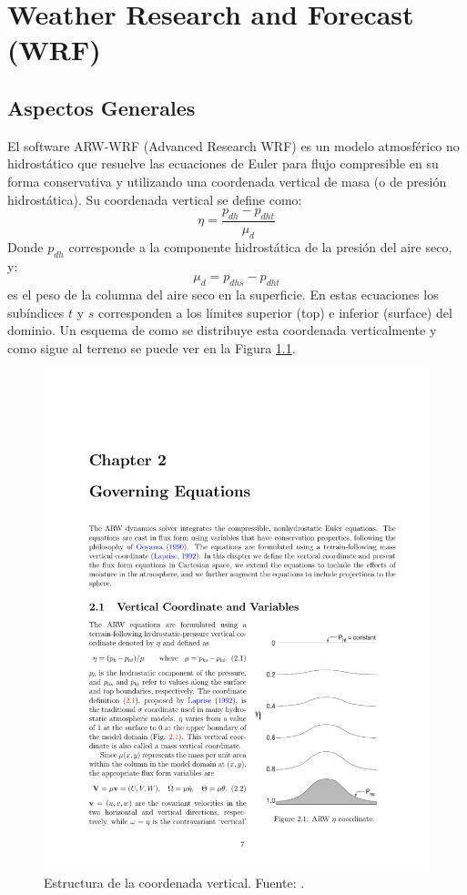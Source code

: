 \chapter{Weather Research and Forecast (WRF)}
\section{Aspectos Generales}
El software ARW-WRF (Advanced Research WRF) es un modelo atmosférico no hidrostático que resuelve las ecuaciones de Euler para flujo compresible en su forma conservativa y utilizando una coordenada vertical de masa (o de presión hidrostática). Su coordenada vertical se define como:
\begin{equation}\label{eq:04_eta}
\eta = \frac{p_{dh}-p_{dht}}{\mu_d}
\end{equation}
Donde $p_{dh}$ corresponde a la componente hidrostática de la presión del aire seco, y:
\begin{equation}
\mu_d = p_{dhs} - p_{dht}
\end{equation}
es el peso de la columna del aire seco en la superficie. En estas ecuaciones los subíndices $t$ y $s$ corresponden a los límites superior (top) e inferior (surface) del dominio. Un esquema de como se distribuye esta coordenada verticalmente y como sigue al terreno se puede ver en la Figura \ref{fig:04_eta}.

\begin{figure}[h!]
	\centering
	\includegraphics[width=0.55\linewidth,trim={11.5cm 3.3cm 1cm 14cm},clip]{Imagenes/04/eta}
	\caption{Estructura de la coordenada vertical. Fuente: \cite{https://doi.org/10.5065/d68s4mvh}.}
	\label{fig:04_eta}
\end{figure}

